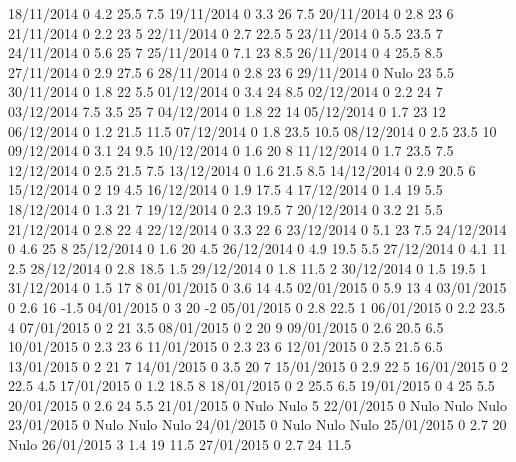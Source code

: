 18/11/2014  0      4.2    25.5   7.5 
19/11/2014  0      3.3    26     7.5 
20/11/2014  0      2.8    23     6 
21/11/2014  0      2.2    23     5 
22/11/2014  0      2.7    22.5   5 
23/11/2014  0      5.5    23.5   7 
24/11/2014  0      5.6    25     7 
25/11/2014  0      7.1    23     8.5 
26/11/2014  0      4      25.5   8.5 
27/11/2014  0      2.9    27.5   6 
28/11/2014  0      2.8    23     6 
29/11/2014  0     Nulo    23     5.5 
30/11/2014  0      1.8    22     5.5 
01/12/2014  0      3.4    24     8.5 
02/12/2014  0      2.2    24     7 
03/12/2014  7.5    3.5    25     7 
04/12/2014  0      1.8    22     14 
05/12/2014  0      1.7    23     12 
06/12/2014  0      1.2    21.5   11.5 
07/12/2014  0      1.8    23.5   10.5 
08/12/2014  0      2.5    23.5   10 
09/12/2014  0      3.1    24     9.5 
10/12/2014  0      1.6    20     8 
11/12/2014  0      1.7    23.5   7.5 
12/12/2014  0      2.5    21.5   7.5 
13/12/2014  0      1.6    21.5   8.5 
14/12/2014  0      2.9    20.5   6 
15/12/2014  0      2      19     4.5 
16/12/2014  0      1.9    17.5   4 
17/12/2014  0      1.4    19     5.5 
18/12/2014  0      1.3    21     7 
19/12/2014  0      2.3    19.5   7 
20/12/2014  0      3.2    21     5.5 
21/12/2014  0      2.8    22     4 
22/12/2014  0      3.3    22     6 
23/12/2014  0      5.1    23     7.5 
24/12/2014  0      4.6    25     8 
25/12/2014  0      1.6    20     4.5 
26/12/2014  0      4.9    19.5   5.5 
27/12/2014  0      4.1    11     2.5 
28/12/2014  0      2.8    18.5   1.5 
29/12/2014  0      1.8    11.5   2 
30/12/2014  0      1.5    19.5   1 
31/12/2014  0      1.5    17     8 
01/01/2015  0      3.6    14     4.5 
02/01/2015  0      5.9    13     4 
03/01/2015  0      2.6    16    -1.5 
04/01/2015  0      3      20    -2 
05/01/2015  0      2.8    22.5   1 
06/01/2015  0      2.2    23.5   4 
07/01/2015  0      2      21     3.5 
08/01/2015  0      2      20     9 
09/01/2015  0      2.6    20.5   6.5 
10/01/2015  0      2.3    23     6 
11/01/2015  0      2.3    23     6 
12/01/2015  0      2.5    21.5   6.5 
13/01/2015  0      2      21     7 
14/01/2015  0      3.5    20     7 
15/01/2015  0      2.9    22     5 
16/01/2015  0      2      22.5   4.5 
17/01/2015  0      1.2    18.5   8 
18/01/2015  0      2      25.5   6.5 
19/01/2015  0      4      25     5.5 
20/01/2015  0      2.6    24     5.5 
21/01/2015  0     Nulo   Nulo    5 
22/01/2015  0     Nulo   Nulo   Nulo
23/01/2015  0     Nulo   Nulo   Nulo
24/01/2015  0     Nulo   Nulo   Nulo
25/01/2015  0      2.7    20    Nulo
26/01/2015  3      1.4    19     11.5 
27/01/2015  0      2.7    24     11.5 
